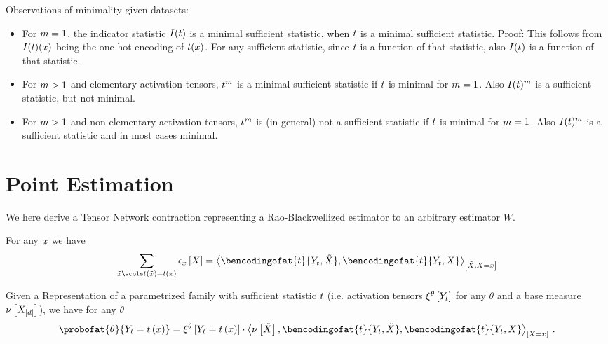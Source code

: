 \documentclass[aps,onecolumn,nofootinbib,pra]{article}
\begin{document}
    Observations of minimality given datasets:
    \begin{itemize}
        \item For $m=1$, the indicator statistic $I(t)$ is a minimal sufficient statistic, when $t$ is a minimal sufficient statistic.
        Proof:
        This follows from $I(t)(x)$ being the one-hot encoding of $t(x)$.
        For any sufficient statistic, since $t$ is a function of that statistic, also $I(t)$ is a function of that statistic.
        \item For $m>1$ and elementary activation tensors, $t^{m}$ is a minimal sufficient statistic if $t$ is minimal for $m=1$.
        Also $I(t)^{m}$ is a sufficient statistic, but not minimal.
        \item For $m>1$ and non-elementary activation tensors, $t^{m}$ is (in general) not a sufficient statistic if $t$ is minimal for $m=1$.
        Also $I(t)^{m}$ is a sufficient statistic and in most cases minimal.
    \end{itemize}


    \section{Point Estimation}

    We here derive a Tensor Network contraction representing a Rao-Blackwellized estimator to an arbitrary estimator $W$.

    For any $x$ we have
    \begin{align*}
        \sum_{\tilde{\catindex} \wcols \sstat(\tilde{\catindex})=\sstat(\catindex)} \onehotmapofat{\tilde{\catindex}}{\catvariable}
        = \contractionof{\bencodingofat{\sstat}{\headvariableof{\sstat},\tilde{\catvariable}},\bencodingofat{\sstat}{\headvariableof{\sstat},\catvariable}}{\tilde{\catvariable},\catvariable=\catindex}
    \end{align*}

    Given a \ComputationActivationNetwork{} Representation of a parametrized family with sufficient statistic $t$ (i.e. activation tensors $\xi^{\theta}\left[Y_{t}\right]$ for any $\theta$ and a base measure $\nu\left[X_{[d]}\right]$), we have for any $\theta$
    \begin{align*}
        \probofat{\theta}{\headvariableof{\sstat}=\sstatat{\catindex}}
        = \acttensorofat{\theta}{\headvariableof{\sstat}=\sstatat{\catindex}} \cdot
        \contractionof{\basemeasureat{\tilde{\catvariable}},\bencodingofat{\sstat}{\headvariableof{\sstat},\tilde{\catvariable}},\bencodingofat{\sstat}{\headvariableof{\sstat},\catvariable}}{\indexedcatvariable} \, .
    \end{align*}
\end{document}
